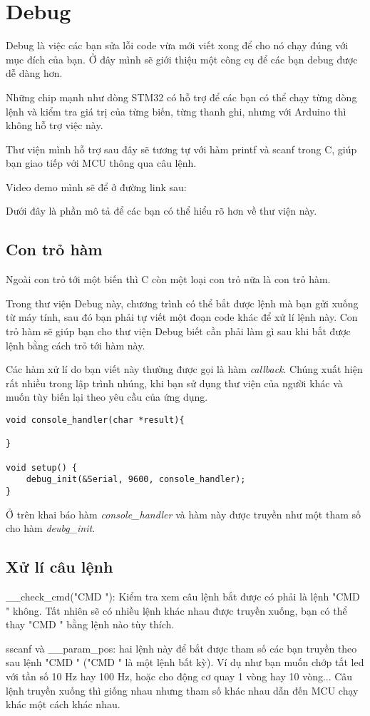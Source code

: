 \chapter{Debug}

Debug là việc các bạn sửa lỗi code vừa mới viết xong để cho nó chạy đúng với mục đích của bạn. Ở đây mình sẽ giới thiệu một công cụ để các bạn debug được dễ dàng hơn. 

Những chip mạnh như dòng STM32 có hỗ trợ để các bạn có thể chạy từng dòng lệnh và kiểm tra giá trị của từng biến, từng thanh ghi, nhưng với Arduino thì không hỗ trợ việc này.

Thư viện mình hỗ trợ sau đây sẽ tương tự với hàm printf và scanf trong C, giúp bạn giao tiếp với MCU thông qua câu lệnh.

Video demo mình sẽ để ở đường link sau: 

Dưới đây là phần mô tả để các bạn có thể hiểu rõ hơn về thư viện này.

\section{Con trỏ hàm}

Ngoài con trỏ tới một biến thì C còn một loại con trỏ nữa là con trỏ hàm.

Trong thư viện Debug này, chương trình có thể bắt được lệnh mà bạn gửi xuống từ máy tính, sau đó bạn phải tự viết một đoạn code khác để xử lí lệnh này. Con trỏ hàm sẽ giúp bạn cho thư viện Debug biết cần phải làm gì sau khi bắt được lệnh bằng cách trỏ tới hàm này.

Các hàm xử lí do bạn viết này thường được gọi là hàm \textit{callback}. Chúng xuất hiện rất nhiều trong lập trình nhúng, khi bạn sử dụng thư viện của người khác và muốn tùy biến lại theo yêu cầu của ứng dụng.\newline

\begin{lstlisting}
void console_handler(char *result){

}

void setup() {
    debug_init(&Serial, 9600, console_handler);
}
\end{lstlisting}

Ở trên khai báo hàm \textit{console\_handler} và hàm này được truyền như một tham số cho hàm \textit{deubg\_init}.

\section{Xử lí câu lệnh}

__check_cmd("CMD "): Kiểm tra xem câu lệnh bắt được có phải là lệnh "CMD " không. Tất nhiên sẽ có nhiều lệnh khác nhau được truyền xuống, bạn có thể thay "CMD " bằng lệnh nào tùy thích.

sscanf và __param_pos: hai lệnh này để bắt được tham số các bạn truyền theo sau lệnh "CMD " ("CMD " là một lệnh bất kỳ). Ví dụ như bạn muốn chớp tắt led với tần số 10 Hz hay 100 Hz, hoặc cho động cơ quay 1 vòng hay 10 vòng... Câu lệnh truyền xuống thì giống nhau nhưng tham số khác nhau dẫn đến MCU chạy khác một cách khác nhau.


